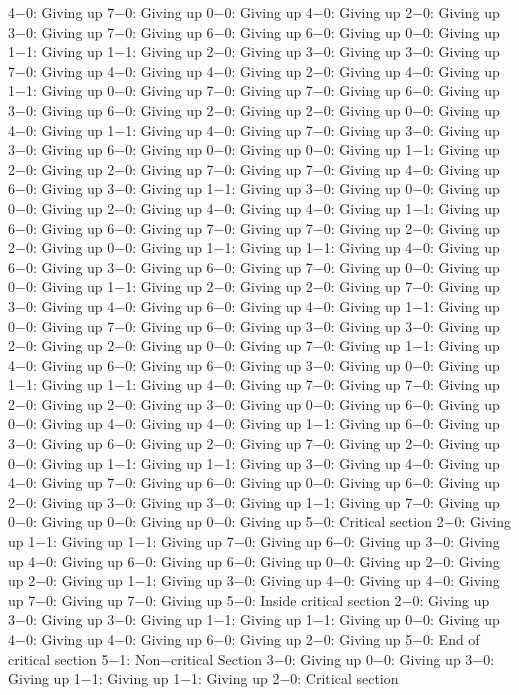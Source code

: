 4−0: Giving up
7−0: Giving up
0−0: Giving up
4−0: Giving up
2−0: Giving up
3−0: Giving up
7−0: Giving up
6−0: Giving up
6−0: Giving up
0−0: Giving up
1−1: Giving up
1−1: Giving up
2−0: Giving up
3−0: Giving up
3−0: Giving up
7−0: Giving up
4−0: Giving up
4−0: Giving up
2−0: Giving up
4−0: Giving up
1−1: Giving up
0−0: Giving up
7−0: Giving up
7−0: Giving up
6−0: Giving up
3−0: Giving up
6−0: Giving up
2−0: Giving up
2−0: Giving up
0−0: Giving up
4−0: Giving up
1−1: Giving up
4−0: Giving up
7−0: Giving up
3−0: Giving up
3−0: Giving up
6−0: Giving up
0−0: Giving up
0−0: Giving up
1−1: Giving up
2−0: Giving up
2−0: Giving up
7−0: Giving up
7−0: Giving up
4−0: Giving up
6−0: Giving up
3−0: Giving up
1−1: Giving up
3−0: Giving up
0−0: Giving up
0−0: Giving up
2−0: Giving up
4−0: Giving up
4−0: Giving up
1−1: Giving up
6−0: Giving up
6−0: Giving up
7−0: Giving up
7−0: Giving up
2−0: Giving up
2−0: Giving up
0−0: Giving up
1−1: Giving up
1−1: Giving up
4−0: Giving up
6−0: Giving up
3−0: Giving up
6−0: Giving up
7−0: Giving up
0−0: Giving up
0−0: Giving up
1−1: Giving up
2−0: Giving up
2−0: Giving up
7−0: Giving up
3−0: Giving up
4−0: Giving up
6−0: Giving up
4−0: Giving up
1−1: Giving up
0−0: Giving up
7−0: Giving up
6−0: Giving up
3−0: Giving up
3−0: Giving up
2−0: Giving up
2−0: Giving up
0−0: Giving up
7−0: Giving up
1−1: Giving up
4−0: Giving up
6−0: Giving up
6−0: Giving up
3−0: Giving up
0−0: Giving up
1−1: Giving up
1−1: Giving up
4−0: Giving up
7−0: Giving up
7−0: Giving up
2−0: Giving up
2−0: Giving up
3−0: Giving up
0−0: Giving up
6−0: Giving up
0−0: Giving up
4−0: Giving up
4−0: Giving up
1−1: Giving up
6−0: Giving up
3−0: Giving up
6−0: Giving up
2−0: Giving up
7−0: Giving up
2−0: Giving up
0−0: Giving up
1−1: Giving up
1−1: Giving up
3−0: Giving up
4−0: Giving up
4−0: Giving up
7−0: Giving up
6−0: Giving up
0−0: Giving up
6−0: Giving up
2−0: Giving up
3−0: Giving up
3−0: Giving up
1−1: Giving up
7−0: Giving up
0−0: Giving up
0−0: Giving up
0−0: Giving up
5−0: Critical section
2−0: Giving up
1−1: Giving up
1−1: Giving up
7−0: Giving up
6−0: Giving up
3−0: Giving up
4−0: Giving up
6−0: Giving up
6−0: Giving up
0−0: Giving up
2−0: Giving up
2−0: Giving up
1−1: Giving up
3−0: Giving up
4−0: Giving up
4−0: Giving up
7−0: Giving up
7−0: Giving up
5−0: Inside critical section
2−0: Giving up
3−0: Giving up
3−0: Giving up
1−1: Giving up
1−1: Giving up
0−0: Giving up
4−0: Giving up
4−0: Giving up
6−0: Giving up
2−0: Giving up
5−0: End of critical section
5−1: Non−critical Section
3−0: Giving up
0−0: Giving up
3−0: Giving up
1−1: Giving up
1−1: Giving up
2−0: Critical section
